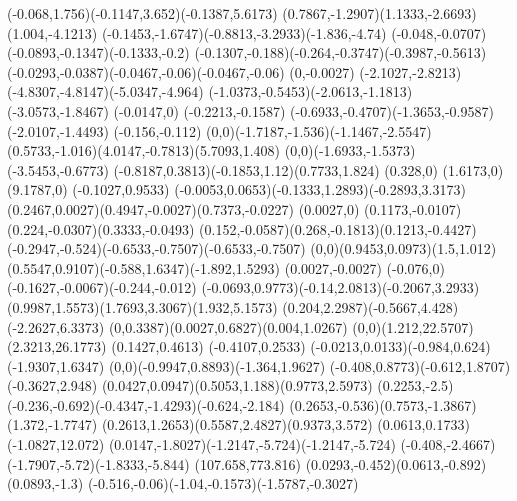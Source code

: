 {    \rcurveto(-0.068,1.756)(-0.1147,3.652)(-0.1387,5.6173)
    \rcurveto(0.7867,-1.2907)(1.1333,-2.6693)(1.004,-4.1213)
    \rcurveto(-0.1453,-1.6747)(-0.8813,-3.2933)(-1.836,-4.74)
    \rcurveto(-0.048,-0.0707)(-0.0893,-0.1347)(-0.1333,-0.2)
    \rcurveto(-0.1307,-0.188)(-0.264,-0.3747)(-0.3987,-0.5613)
    \rcurveto(-0.0293,-0.0387)(-0.0467,-0.06)(-0.0467,-0.06)
    \rlineto(0,-0.0027)
    \rcurveto(-2.1027,-2.8213)(-4.8307,-4.8147)(-5.0347,-4.964)
    \rcurveto(-1.0373,-0.5453)(-2.0613,-1.1813)(-3.0573,-1.8467)
    \rlineto(-0.0147,0)
    \rlineto(-0.2213,-0.1587)
    \rcurveto(-0.6933,-0.4707)(-1.3653,-0.9587)(-2.0107,-1.4493)
    \rlineto(-0.156,-0.112)
    \rcurveto(0,0)(-1.7187,-1.536)(-1.1467,-2.5547)
    \rcurveto(0.5733,-1.016)(4.0147,-0.7813)(5.7093,1.408)
    \rcurveto(0,0)(-1.6933,-1.5373)(-3.5453,-0.6773)
    \rcurveto(-0.8187,0.3813)(-0.1853,1.12)(0.7733,1.824)
    \rlineto(0.328,0)
    \rlineto(1.6173,0)
    \rlineto(9.1787,0)
    \rlineto(-0.1027,0.9533)
    \rcurveto(-0.0053,0.0653)(-0.1333,1.2893)(-0.2893,3.3173)
    \rcurveto(0.2467,0.0027)(0.4947,-0.0027)(0.7373,-0.0227)
    \rlineto(0.0027,0)
    \rcurveto(0.1173,-0.0107)(0.224,-0.0307)(0.3333,-0.0493)
    \rcurveto(0.152,-0.0587)(0.268,-0.1813)(0.1213,-0.4427)
    \rcurveto(-0.2947,-0.524)(-0.6533,-0.7507)(-0.6533,-0.7507)
    \rcurveto(0,0)(0.9453,0.0973)(1.5,1.012)
    \rcurveto(0.5547,0.9107)(-0.588,1.6347)(-1.892,1.5293)
    \rlineto(0.0027,-0.0027)
    \rcurveto(-0.076,0)(-0.1627,-0.0067)(-0.244,-0.012)
    \rcurveto(-0.0693,0.9773)(-0.14,2.0813)(-0.2067,3.2933)
    \rcurveto(0.9987,1.5573)(1.7693,3.3067)(1.932,5.1573)
    \rcurveto(0.204,2.2987)(-0.5667,4.428)(-2.2627,6.3373)
    \rcurveto(0,0.3387)(0.0027,0.6827)(0.004,1.0267)
    \rcurveto(0,0)(1.212,22.5707)(2.3213,26.1773)
    \rlineto(0.1427,0.4613)
    \rlineto(-0.4107,0.2533)
    \rcurveto(-0.0213,0.0133)(-0.984,0.624)(-1.9307,1.6347)
    \rcurveto(0,0)(-0.9947,0.8893)(-1.364,1.9627)
    \rcurveto(-0.408,0.8773)(-0.612,1.8707)(-0.3627,2.948)
    \rcurveto(0.0427,0.0947)(0.5053,1.188)(0.9773,2.5973)
    \rlineto(0.2253,-2.5)
    \rcurveto(-0.236,-0.692)(-0.4347,-1.4293)(-0.624,-2.184)
    \rcurveto(0.2653,-0.536)(0.7573,-1.3867)(1.372,-1.7747)
    \rcurveto(0.2613,1.2653)(0.5587,2.4827)(0.9373,3.572)
    \rlineto(0.0613,0.1733)
    \rlineto(-1.0827,12.072)
    \rcurveto(0.0147,-1.8027)(-1.2147,-5.724)(-1.2147,-5.724)
    \rcurveto(-0.408,-2.4667)(-1.7907,-5.72)(-1.8333,-5.844)
    \moveto(107.658,773.816)
    \rcurveto(0.0293,-0.452)(0.0613,-0.892)(0.0893,-1.3)
    \rcurveto(-0.516,-0.06)(-1.04,-0.1573)(-1.5787,-0.3027)
}

